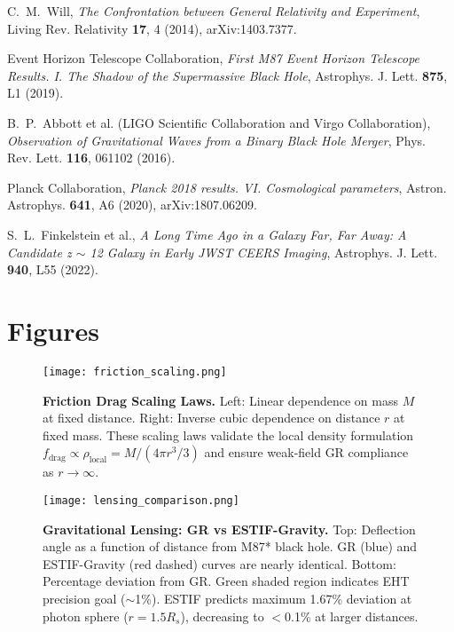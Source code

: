 \documentclass[12pt]{article}
\begin{document}
\begin{thebibliography}{99}

C.~M.~Will, \textit{The Confrontation between General Relativity and Experiment},
Living Rev. Relativity \textbf{17}, 4 (2014), arXiv:1403.7377.

Event Horizon Telescope Collaboration,
\textit{First M87 Event Horizon Telescope Results. I. The Shadow of the Supermassive Black Hole},
Astrophys. J. Lett. \textbf{875}, L1 (2019).

B.~P.~Abbott et al. (LIGO Scientific Collaboration and Virgo Collaboration),
\textit{Observation of Gravitational Waves from a Binary Black Hole Merger},
Phys. Rev. Lett. \textbf{116}, 061102 (2016).

Planck Collaboration,
\textit{Planck 2018 results. VI. Cosmological parameters},
Astron. Astrophys. \textbf{641}, A6 (2020), arXiv:1807.06209.

S.~L.~Finkelstein et al.,
\textit{A Long Time Ago in a Galaxy Far, Far Away: A Candidate z $\sim$ 12 Galaxy in Early JWST CEERS Imaging},
Astrophys. J. Lett. \textbf{940}, L55 (2022).

\end{thebibliography}

\appendix

\section{Figures}

\begin{figure}[h!]
\centering
\texttt{[image: friction\_scaling.png]}
\caption{\textbf{Friction Drag Scaling Laws.} Left: Linear dependence on mass $M$ at fixed distance. Right: Inverse cubic dependence on distance $r$ at fixed mass. These scaling laws validate the local density formulation $f_{\text{drag}} \propto \rho_{\text{local}} = M/(4\pi r^3/3)$ and ensure weak-field GR compliance as $r \to \infty$.}
\label{fig:friction_scaling}
\end{figure}

\begin{figure}[h!]
\centering
\texttt{[image: lensing\_comparison.png]}
\caption{\textbf{Gravitational Lensing: GR vs ESTIF-Gravity.} Top: Deflection angle as a function of distance from M87* black hole. GR (blue) and ESTIF-Gravity (red dashed) curves are nearly identical. Bottom: Percentage deviation from GR. Green shaded region indicates EHT precision goal ($\sim$1\%). ESTIF predicts maximum 1.67\% deviation at photon sphere ($r = 1.5 R_s$), decreasing to $<$0.1\% at larger distances.}
\label{fig:lensing}
\end{figure}
\end{document}

